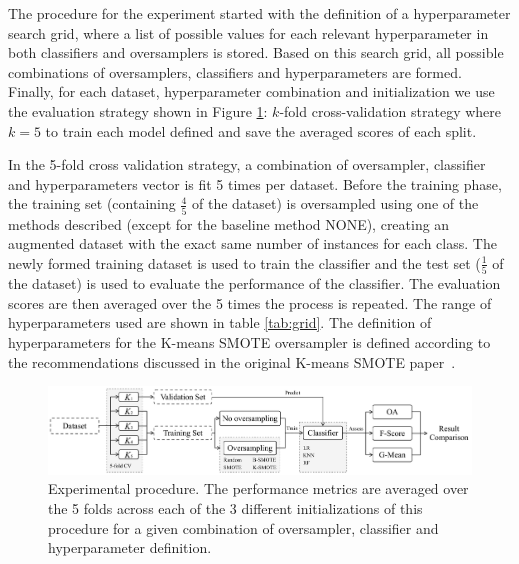 \documentclass[information,article,submit,moreauthors,pdftex]{Definitions/mdpi}
\begin{document}
\begin{paracol}{2}
The procedure for the experiment started with the definition of a
hyperparameter search grid, where a list of possible values for each relevant
hyperparameter in both classifiers and oversamplers is stored. Based on this
search grid, all possible combinations of oversamplers, classifiers and
hyperparameters are formed.  Finally, for each dataset, hyperparameter
combination and initialization we use the evaluation strategy shown in Figure
\ref{fig:experiment_pipeline}: $k$-fold cross-validation strategy where $k=5$
to train each model defined and save the averaged scores of each split.

In the 5-fold cross validation strategy, a combination
of oversampler, classifier and hyperparameters vector is fit 5 times
per dataset. Before the training
phase, the training set
(containing $\frac{4}{5}$ of the dataset) is oversampled using one of the methods
described (except for the baseline method NONE), creating an augmented
dataset with the exact same number of instances for
each class. The newly formed training dataset is used to train the classifier
and the test set ($\frac{1}{5}$ of the dataset)
is used to evaluate the performance of the classifier. The evaluation scores
are then averaged over the 5 times the process is repeated. The range of
hyperparameters used are shown in table \ref{tab:grid}. The definition of
hyperparameters for the K-means SMOTE oversampler is defined according to the
recommendations discussed in the original K-means SMOTE
paper~\citep{Douzas2018}.

\end{paracol}
\begin{figure}
	\centering
    \captionsetup{justification=centering}
    \caption{Experimental procedure. The performance metrics are averaged over
    the 5 folds across each of the 3 different initializations of this
    procedure for a given combination of oversampler, classifier and
    hyperparameter definition.
    \vspace{.25cm}}\label{fig:experiment_pipeline}
	\includegraphics[width=1\linewidth]{../analysis/experiment_pipeline}
\end{figure}
\begin{paracol}{2}
\linenumbers
\switchcolumn

\end{paracol}
\end{document}
